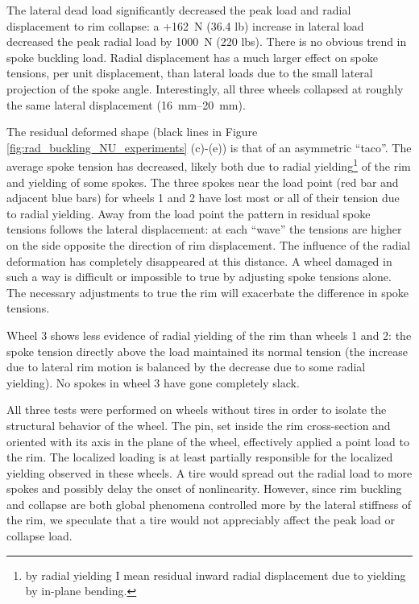 \documentclass[\rootdir/thesis.tex]{subfiles}
\begin{document}
The lateral dead load significantly decreased the peak load and radial displacement to rim collapse: a +\SI{162}{N} (\num{36.4} lb) increase in lateral load decreased the peak radial load by \SI{1000}{N} (\num{220} lbs). There is no obvious trend in spoke buckling load. Radial displacement has a much larger effect on spoke tensions, per unit displacement, than lateral loads due to the small lateral projection of the spoke angle. Interestingly, all three wheels collapsed at roughly the same lateral displacement (\SIrange{16}{20}{mm}).

The residual deformed shape (black lines in Figure \ref{fig:rad_buckling_NU_experiments} (c)-(e)) is that of an asymmetric ``taco''. The average spoke tension has decreased, likely both due to radial yielding\footnote{by radial yielding I mean residual inward radial displacement due to yielding by in-plane bending.} of the rim and yielding of some spokes. The three spokes near the load point (red bar and adjacent blue bars) for wheels 1 and 2 have lost most or all of their tension due to radial yielding. Away from the load point the pattern in residual spoke tensions follows the lateral displacement: at each ``wave'' the tensions are higher on the side opposite the direction of rim displacement. The influence of the radial deformation has completely disappeared at this distance. A wheel damaged in such a way is difficult or impossible to true by adjusting spoke tensions alone. The necessary adjustments to true the rim will exacerbate the difference in spoke tensions.

Wheel 3 shows less evidence of radial yielding of the rim than wheels 1 and 2: the spoke tension directly above the load maintained its normal tension (the increase due to lateral rim motion is balanced by the decrease due to some radial yielding). No spokes in wheel 3 have gone completely slack.

All three tests were performed on wheels without tires in order to isolate the structural behavior of the wheel. The pin, set inside the rim cross-section and oriented with its axis in the plane of the wheel, effectively applied a point load to the rim. The localized loading is at least partially responsible for the localized yielding observed in these wheels. A tire would spread out the radial load to more spokes and possibly delay the onset of nonlinearity. However, since rim buckling and collapse are both global phenomena controlled more by the lateral stiffness of the rim, we speculate that a tire would not appreciably affect the peak load or collapse load.
\end{document}
